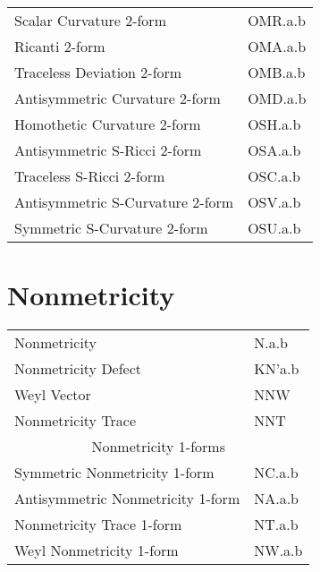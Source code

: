 \documentclass[twoside,openright]{report}
\newcommand{\grgtt}{\ttfamily}
\renewcommand{\tt}{\grgtt}
\begin{document}
\begin{center}
\begin{tabular}{|l|l|}
\tt    Scalar Curvature 2-form         &\tt    OMR.a.b \\
\tt    Ricanti 2-form                  &\tt    OMA.a.b \\
\tt    Traceless Deviation 2-form      &\tt    OMB.a.b \\
\tt    Antisymmetric Curvature 2-form  &\tt    OMD.a.b \\
\tt    Homothetic Curvature 2-form     &\tt    OSH.a.b \\
\tt    Antisymmetric S-Ricci 2-form    &\tt  OSA.a.b  \\
\tt    Traceless S-Ricci 2-form        &\tt  OSC.a.b  \\
\tt    Antisymmetric S-Curvature 2-form &\tt  OSV.a.b  \\
\tt    Symmetric S-Curvature 2-form     &\tt  OSU.a.b  \\
\hline
\end{tabular}


\section{Nonmetricity}
\begin{tabular}{|l|l|}\hline
\tt    Nonmetricity        &\tt   N.a.b\\
\tt    Nonmetricity Defect &\tt   KN'a.b\\
\tt    Weyl Vector         &\tt   NNW\\
\tt    Nonmetricity Trace  &\tt   NNT\\
\hline
\multicolumn{2}{|c|}{\tt    Nonmetricity 1-forms}\\
\tt    Symmetric Nonmetricity 1-form     &\tt   NC.a.b\\
\tt    Antisymmetric Nonmetricity 1-form &\tt   NA.a.b\\
\tt    Nonmetricity Trace  1-form        &\tt   NT.a.b\\
\tt    Weyl Nonmetricity 1-form          &\tt   NW.a.b\\
\hline\end{tabular}



\end{center}
\end{document}
